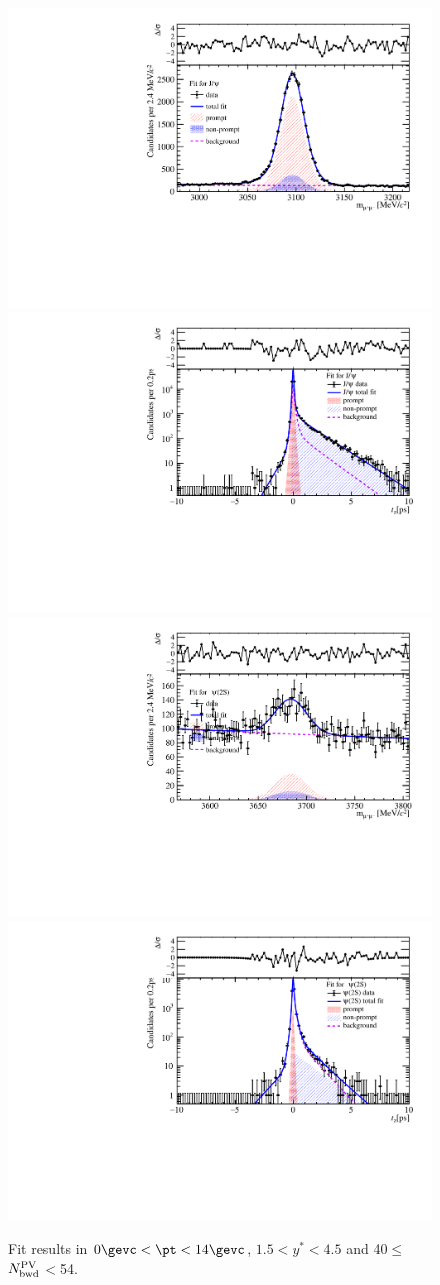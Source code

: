 \begin{figure}[H]
\begin{center}
\includegraphics[width=0.45\linewidth]{pdf/pPb/BWorkdir/TwoDimFit/ProjMass/Jpsi_n4y1pt1.pdf}
\includegraphics[width=0.45\linewidth]{pdf/pPb/BWorkdir/TwoDimFit/ProjTz/Jpsi_n4y1pt1.pdf}
\vspace*{-0.5cm}
\includegraphics[width=0.45\linewidth]{pdf/pPb/BWorkdir/TwoDimFit/ProjMass/Psi2S_n4y1pt1.pdf}
\includegraphics[width=0.45\linewidth]{pdf/pPb/BWorkdir/TwoDimFit/ProjTz/Psi2S_n4y1pt1.pdf}
\vspace*{-0.5cm}
\end{center}
\caption{Fit results in $0\gevc<\pt<14\gevc$, $1.5<y^*<4.5$ and 40$\leq$$N_{\rm bwd}^{\rm PV}$$<$54.}
\end{figure}
